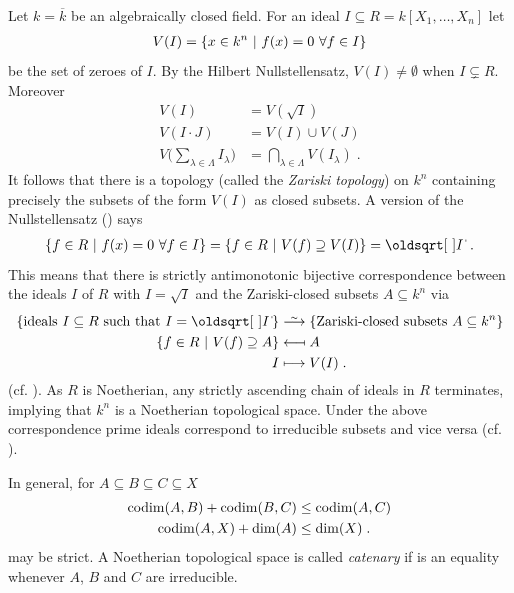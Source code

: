 \documentclass[a4paper,parskip=half,numbers=enddot, DIV=12]{scrreprt}
\begin{document}
\begin{example}
	Let $k =\overline{k}$ be an algebraically closed field. For an ideal $I\subseteq R = k[X_1,\ldots,X_n]$ let 
	\begin{align*}
	V(I) = \left\{x\in k^n\ \middle|\  f(x)=0\ \forall f\in I\right\}
	\end{align*}
	be the set of zeroes of $I$. By the Hilbert Nullstellensatz, $V(I) \neq \emptyset$ when $I\subsetneq R$. Moreover 
	\begin{align*}
	V(I)& = V\left(\sqrt{I}\right)\\
	V(I\cdot J ) &= V(I) \cup V(J)\\
	V\bigg(\sum_{\lambda\in\Lambda} I_\lambda\bigg) &=\bigcap_{\lambda\in\Lambda} V(I_\lambda)\;.
	\end{align*}
	It follows that there is a topology (called the \emph{Zariski topology}) on $k^n$ containing precisely the subsets of the form $V(I)$ as closed subsets. A version of the Nullstellensatz (\cite[Proposition~1.7.1]{alg1}) says
	\begin{align*}
	\left\{f\in R\st f(x) = 0\ \forall f\in I\right\} = \left\{f\in R\st V(f)\supseteq V(I)\right\} = \sqrt{I}\;.
	\end{align*}
	This means that there is strictly antimonotonic bijective correspondence between the ideals $I$ of $R$ with $I=\sqrt{I}$ and the Zariski-closed subsets $A\subseteq k^n$ via
	\begin{align*}
	\left\{\text{ideals }I\subseteq R\text{ such that }I=\sqrt I\right\}&\isomorphism\left\{\text{Zariski-closed subsets }A\subseteq k^n\right\}\\
	\left\{f\in R\st V(f)\supseteq A\right\} &\longmapsfrom A\\
	I&\longmapsto V(I)\;.
	\end{align*}
	(cf. \cite[Remark~2.1.1]{alg1}). As $R$ is Noetherian, any strictly ascending chain of ideals in $R$ terminates, implying that $k^n$ is a Noetherian topological space. Under the above correspondence prime ideals correspond to irreducible subsets and vice versa (cf. \cite[Proposition~2.1.2]{alg1}).  
\end{example}
\begin{rem}
	In general, for $A\subseteq B\subseteq C\subseteq X$
	\begin{align}\lbl{eq:codimIneq}
	\codim(A,B) +\codim(B,C) &\leq \codim(A,C) \\ 
	\codim(A,X)+\dim (A) &\leq \dim (X)\;.\lbl{eq:codimIneq2}
	\end{align}
	may be strict. A Noetherian topological space is called \emph{catenary} if  is an equality whenever $A$, $B$ and $C$ are irreducible.
\end{rem}
\end{document}

